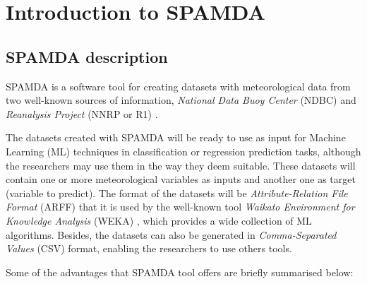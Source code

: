 
\chapter{Introduction to SPAMDA}

	\begin{onehalfspace}

		\section{SPAMDA description}

			SPAMDA is a software tool for creating datasets with meteorological data from two well-known sources of information, \textit{National Data Buoy Center} (NDBC) \cite{NOAA} and \textit{Reanalysis Project} (NNRP or R1) \cite{Kalnay1996, Kistler2001}.
			
			The datasets created with SPAMDA will be ready to use as input for Machine Learning (ML) techniques in classification or regression prediction tasks, although the researchers may use them in the way they deem suitable. These datasets will contain one or more meteorological variables as inputs and another one as target (variable to predict). The format of the datasets will be \textit{Attribute-Relation File Format} (ARFF) \cite{WEKA_ARFF} that it is used by the well-known tool \textit{Waikato Environment for Knowledge Analysis} (WEKA) \cite{WEKA}, which provides a wide collection of ML algorithms. Besides, the datasets can also be generated in \textit{Comma-Separated Values} (CSV) format, enabling the researchers to use others tools.
			
			Some of the advantages that SPAMDA tool offers are briefly summarised below:


\end{onehalfspace}
